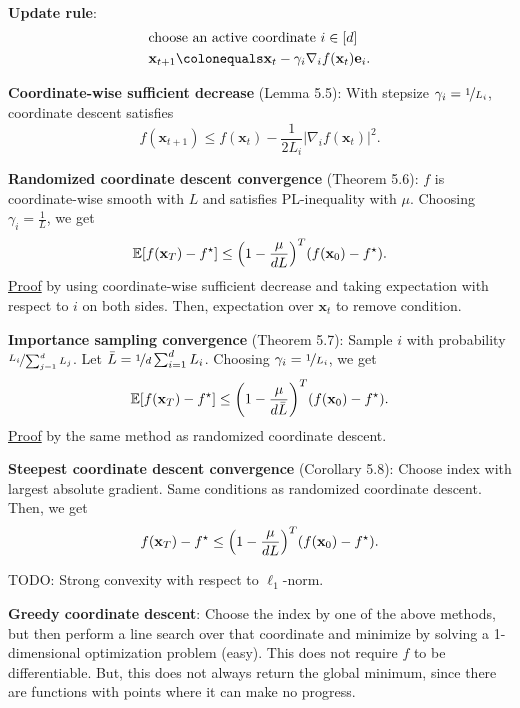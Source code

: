 \documentclass{article}
\newcommand{\lft}{\mathopen{}\mathclose\bgroup\left}
\newcommand{\rgt}{\aftergroup\egroup\right}
\newcommand{\E}{\mathbb{E}}
\renewcommand{\vec}[1]{\mathbf{#1}}
\newenvironment{topic}[1]
{\textbf{\sffamily \colorbox{black}{\rlap{\textbf{\textcolor{white}{#1}}}\hspace{\linewidth}\hspace{-2\fboxsep}}} \\ \vspace{0.2cm}}
{}
\begin{document}
\begin{multicols*}{2}
\begin{topic}{5 Coordinate descent}
        \textbf{Update rule}:
        \begin{align*}
             & \text{choose an active coordinate $i \in [d]$}                                   \\
             & \vec{x}_{t+1} \colonequals \vec{x}_t - \gamma_i \nabla_i f(\vec{x}_t) \vec{e}_i.
        \end{align*}

        \textbf{Coordinate-wise sufficient decrease} (Lemma 5.5): With stepsize $\gamma_i = \nicefrac{1}{L_i}$, coordinate descent satisfies \[
            f(\vec{x}_{t+1}) \leq f(\vec{x}_t) - \frac{1}{2L_i} | \nabla_i f(\vec{x}_t) |^2.
        \]

        \textbf{Randomized coordinate descent convergence} (Theorem 5.6): $f$ is coordinate-wise
        smooth with $L$ and satisfies PL-inequality with $\mu$. Choosing $\gamma_i = \frac{1}{L}$, we
        get \[
            \E[f(\vec{x}_T) - f^\star] \leq \lft( 1 - \frac{\mu}{dL} \rgt)^T (f(\vec{x}_0) - f^\star).
        \]
        \underline{Proof} by using coordinate-wise sufficient decrease and taking expectation with
        respect to $i$ on both sides. Then, expectation over $\vec{x}_t$ to remove condition.

        \textbf{Importance sampling convergence} (Theorem 5.7): Sample $i$ with probability $\nicefrac{L_i}{\sum_{j=1}^{d} L_j}$. Let $\bar{L} = \nicefrac{1}{d} \sum_{i=1}^{d} L_i$. Choosing $\gamma_i = \nicefrac{1}{L_i}$, we get \[
            \E[f(\vec{x}_T) - f^\star] \leq \lft( 1 - \frac{\mu}{d \bar{L}} \rgt)^T (f(\vec{x}_0) - f^\star).
        \]
        \underline{Proof} by the same method as randomized coordinate descent.

        \textbf{Steepest coordinate descent convergence} (Corollary 5.8): Choose index with largest
        absolute gradient. Same conditions as randomized coordinate descent. Then, we get \[
            f(\vec{x}_T) - f^\star \leq \lft( 1 - \frac{\mu}{dL} \rgt)^T (f(\vec{x}_0) - f^\star).
        \]

        TODO: Strong convexity with respect to $\ell_1$-norm.

        \textbf{Greedy coordinate descent}: Choose the index by one of the above methods, but then
        perform a line search over that coordinate and minimize by solving a 1-dimensional
        optimization problem (easy). This does not require $f$ to be differentiable. But, this does
        not always return the global minimum, since there are functions with points where it can make
        no progress.


\end{topic}
\end{multicols*}
\end{document}
